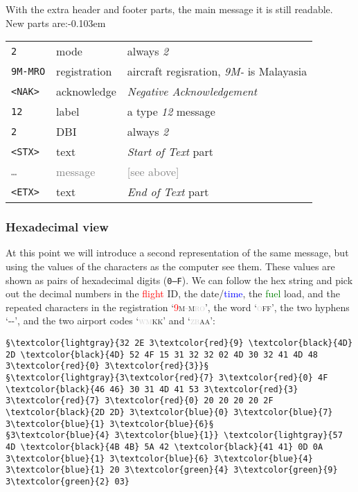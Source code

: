 \documentclass[tikz,a4paper,12pt]{article}
\begin{document}
{With the extra header and footer parts, the main message it is still readable. New parts are:\unskip\parfillskip-0.103em \par}

\begin{center}
\begin{tabular}{p{1.5cm}p{2cm}p{8cm}}
\hfill\texttt{2}&mode&always \emph{2}\\
\hfill\texttt{9M-MRO}&registration&aircraft regisration, \emph{9M-} is Malayasia\\
\hfill\texttt{<NAK>}&acknowledge&\emph{Negative Acknowledgement}\\
\hfill\texttt{12}&label&a type \emph{12} message\\
\hfill\texttt{2}&DBI&always \emph{2}\\
\hfill\texttt{<STX>}&text&\emph{Start of Text} part\\
\hline
\hfill\textcolor{gray}{\texttt{\ldots}}&\textcolor{gray}{message}&\textcolor{gray}{[see above]}\\
\hline
\hfill\texttt{<ETX>}&text&\emph{End of Text} part\\
\end{tabular}
\end{center}

\subsubsection*{Hexadecimal view}
At this point we will introduce a second representation of the same
message, but using the values of the characters as the computer see
them.  These values are shown as pairs of hexadecimal digits (\texttt{0--F}).  We can follow the hex string and pick out the decimal numbers in the
\textcolor{red}{flight} ID, the date/\textcolor{blue}{time}, the
\textcolor{green}{fuel} load, and the repeated characters in the
registration
\textsc{`\textcolor{red}{9}m\textcolor{lightgray}{-}m\textcolor{lightgray}{ro}'},
the word \textsc{`\textcolor{lightgray}{o}ff'}, the two hyphens `-{}-', and
the two airport codes \textsc{`\textcolor{lightgray}{wm}kk'} and
\textsc{`\textcolor{lightgray}{zb}aa'}:

\begin{lstlisting}[language=ACARS]
         §\textcolor{lightgray}{32 2E 3\textcolor{red}{9} \textcolor{black}{4D} 2D \textcolor{black}{4D} 52 4F 15 31 32 32 02 4D 30 32 41 4D 48 3\textcolor{red}{0} 3\textcolor{red}{3}}§
§\textcolor{lightgray}{3\textcolor{red}{7} 3\textcolor{red}{0} 4F \textcolor{black}{46 46} 30 31 4D 41 53 3\textcolor{red}{3} 3\textcolor{red}{7} 3\textcolor{red}{0} 20 20 20 20 2F \textcolor{black}{2D 2D} 3\textcolor{blue}{0} 3\textcolor{blue}{7} 3\textcolor{blue}{1} 3\textcolor{blue}{6}§
§3\textcolor{blue}{4} 3\textcolor{blue}{1}} \textcolor{lightgray}{57 4D \textcolor{black}{4B 4B} 5A 42 \textcolor{black}{41 41} 0D 0A 3\textcolor{blue}{1} 3\textcolor{blue}{6} 3\textcolor{blue}{4} 3\textcolor{blue}{1} 20 3\textcolor{green}{4} 3\textcolor{green}{9} 3\textcolor{green}{2} 03}
\end{lstlisting}
\end{document}
